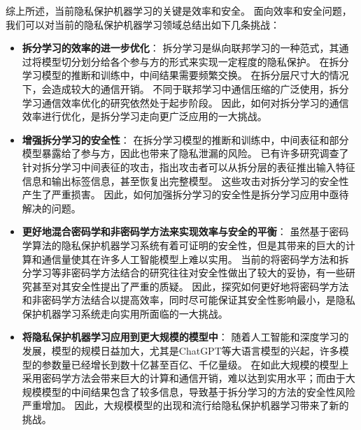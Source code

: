 综上所述，当前隐私保护机器学习的关键是效率和安全。
面向效率和安全问题，我们可以对当前的隐私保护机器学习领域总结出如下几条挑战：
\begin{itemize}
    \item \textbf{拆分学习的效率的进一步优化}：
    拆分学习是纵向联邦学习的一种范式，其通过将模型切分划分给各个参与方的形式来实现一定程度的隐私保护。
    在拆分学习模型的推断和训练中，中间结果需要频繁交换。
    在拆分层尺寸大的情况下，会造成较大的通信开销。
    不同于联邦学习中通信压缩的广泛使用，拆分学习通信效率优化的研究依然处于起步阶段。
    因此，如何对拆分学习的通信效率进行优化，是拆分学习走向更广泛应用的一大挑战。

    \item \textbf{增强拆分学习的安全性}：
    在拆分学习模型的推断和训练中，中间表征和部分模型暴露给了参与方，因此也带来了隐私泄漏的风险。
    已有许多研究调查了针对拆分学习中间表征的攻击，指出攻击者可以从拆分层的表征推出输入特征信息和输出标签信息，甚至恢复出完整模型。
    这些攻击对拆分学习的安全性产生了严重损害。
    因此，如何加强拆分学习的安全性是拆分学习应用中亟待解决的问题。

    \item \textbf{更好地混合密码学和非密码学方法来实现效率与安全的平衡}：
    虽然基于密码学算法的隐私保护机器学习系统有着可证明的安全性，但是其带来的巨大的计算和通信量使其在许多人工智能模型上难以实用。
    当前的将密码学方法和拆分学习等非密码学方法结合的研究往往对安全性做出了较大的妥协，有一些研究甚至对其安全性提出了严重的质疑。
    因此，探究如何更好地将密码学方法和非密码学方法结合以提高效率，同时尽可能保证其安全性影响最小，是隐私保护机器学习系统走向实用所面临的一大挑战。

    \item \textbf{将隐私保护机器学习应用到更大规模的模型中}：
    随着人工智能和深度学习的发展，模型的规模日益加大，尤其是ChatGPT等大语言模型的兴起，许多模型的参数量已经增长到数十亿甚至百亿、千亿量级。
    在如此大规模的模型上采用密码学方法会带来巨大的计算和通信开销，难以达到实用水平；而由于大规模模型的中间结果包含了较多信息，导致基于拆分学习的方法的安全性风险严重增加。
    因此，大规模模型的出现和流行给隐私保护机器学习带来了新的挑战。
\end{itemize}


